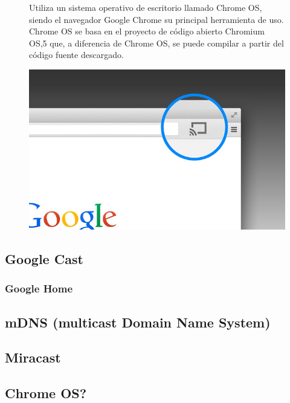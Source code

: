 \begin{figure}[ht]
	\begin{minipage}[b]{0.55\linewidth}
	Utiliza un sistema operativo de escritorio llamado Chrome OS, siendo el navegador Google Chrome su principal herramienta de uso.
	Chrome OS se basa en el proyecto de código abierto Chromium OS,5 que, a diferencia de Chrome OS, se puede compilar a partir del código fuente descargado.
	\end{minipage}%
	\begin{minipage}[b]{0.45\linewidth}
		\centering
		\includegraphics[width=.65\linewidth]{./Imagenes/googlecastbrowser.jpg}
	\end{minipage}
\end{figure}







\subsection{Google Cast}
\subsubsection{Google Home}

\subsection{mDNS (multicast Domain Name System)}


\subsection{Miracast}



\subsection{Chrome OS?}
